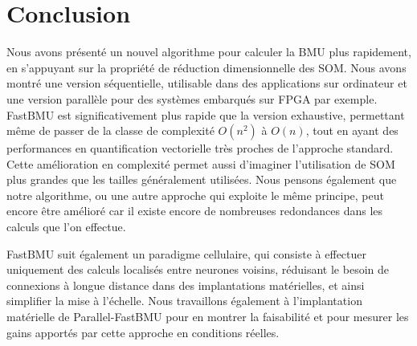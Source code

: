 	\section{Conclusion}

	Nous avons présenté un nouvel algorithme pour calculer la BMU plus rapidement, en s'appuyant sur la propriété de réduction dimensionnelle des SOM. Nous avons montré une version séquentielle, utilisable dans des applications sur ordinateur et une version parallèle pour des systèmes embarqués sur FPGA par exemple. FastBMU est significativement plus rapide que la version exhaustive, permettant même de passer de la classe de complexité $O(n^2)$ à $O(n)$, tout en ayant des performances en quantification vectorielle très proches de l'approche standard. Cette amélioration en complexité permet aussi d'imaginer l'utilisation de SOM plus grandes que les tailles généralement utilisées. Nous pensons également que notre algorithme, ou une autre approche qui exploite le même principe, peut encore être amélioré car il existe encore de nombreuses redondances dans les calculs que l'on effectue.

	FastBMU suit également un paradigme cellulaire, qui consiste à effectuer uniquement des calculs localisés entre neurones voisins, réduisant le besoin de connexions à longue distance dans des implantations matérielles, et ainsi simplifier la mise à l'échelle. Nous travaillons également à l'implantation matérielle de Parallel-FastBMU pour en montrer la faisabilité et pour mesurer les gains apportés par cette approche en conditions réelles.
		

